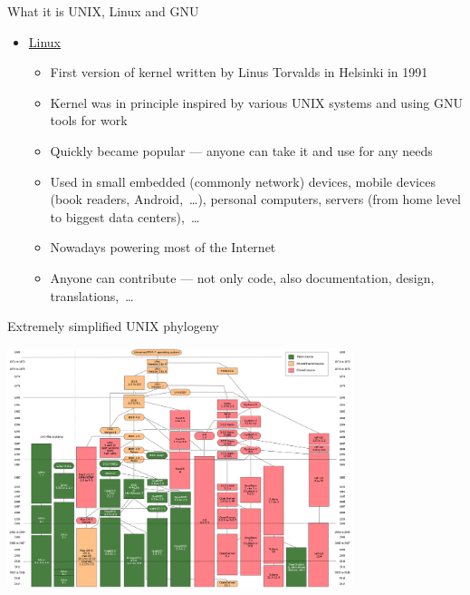 \documentclass[compress, ucs, xelatex, 11pt, xcolor=svgnames,
  hyperref={
    bookmarks=true,
    unicode=true,
    colorlinks=true,
    pdftitle={Linux, command line and MetaCentrum},
    plainpages=false,
    pdfauthor={Vojtech Zeisek},
    pdfsubject={Course about use of Linux command line, writing shell scripts and using MetaCentrum of CESNET},
    pdfcreator={XeLaTeX},
    pdfkeywords={Linux, GNU, BASH, shell, command line, MetaCentrum},
    linkcolor=DarkRed,
    anchorcolor=DarkBlue,
    citecolor=Indigo,
    filecolor=NavyBlue,
    menucolor=DarkMagenta,
    urlcolor=DarkBlue,
    pdftex},
  url={hyphens, lowtilde} %
  ]{beamer}
\begin{document}
\begin{frame}[allowframebreaks]{What it is UNIX, Linux and GNU}
\begin{itemize}
\begin{itemize}
      \item Generally set of basic system tools --- working with many kernels (Linux BSD*, Mac's Darwin,~\ldots), also present in many commercial paid UNIX systems
      \item Source code is free --- anyone can study it (Security!), report bugs, contribute, modify, share it,~\ldots
      \item GNU General Public License (GPL) --- free spirit of open-source --- license, idea, how to share software
    \end{itemize}
    \item \href{https://en.wikipedia.org/wiki/Linux}{Linux}
    \begin{itemize}
      \item First version of kernel written by Linus Torvalds in Helsinki in 1991
      \item Kernel was in principle inspired by various UNIX systems and using GNU tools for work
      \item Quickly became popular --- anyone can take it and use for any needs
      \item Used in small embedded (commonly network) devices, mobile devices (book readers, Android,~\ldots), personal computers, servers (from home level to biggest data centers),~\ldots
      \item Nowadays powering most of the Internet
      \item Anyone can contribute --- not only code, also documentation, design, translations,~\ldots
    \end{itemize}
  \end{itemize}
\end{frame}

\begin{frame}{Extremely simplified UNIX phylogeny}
  \begin{center}
    \includegraphics[height=7cm]{unix_history-simple.png}
  \end{center}
\end{frame}
\end{document}
